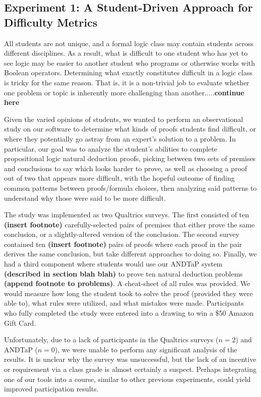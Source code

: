 \documentclass[ms]{uncgdissertationexp2}
\theoremstyle{plain}
\theoremstyle{definition}
\theoremstyle{remark}
\begin{document}
\subsection{Experiment 1: A Student-Driven Approach for Difficulty Metrics}
All students are not unique, and a formal logic class may contain students across different disciplines. As a result, what is difficult to one student who has yet to see logic may be easier to another student who programs or otherwise works with Boolean operators. Determining what exactly constitutes difficult in a logic class is tricky for the same reason. That is, it is a non-trivial job to evaluate whether one problem or topic is inherently more challenging than another.....\textbf{continue here}

Given the varied opinions of students, we wanted to perform an observational study on our software to determine what kinds of proofs students find difficult, or where they potentially go astray from an expert's solution to a problem. In particular, our goal was to analyze the student's abilities to complete propositional logic natural deduction proofs, picking between two sets of premises and conclusions to say which looks harder to prove, as well as choosing a proof out of two that appears more difficult, with the hopeful outcome of finding common patterns between proofs/formula choices, then analyzing said patterns to understand why those were said to be more difficult.

The study was implemented as two Qualtrics surveys. The first consisted of ten \textbf{(insert footnote)} carefully-selected pairs of premises that either prove the same conclusion, or a slightly-altered version of the conclusion. The second survey contained ten \textbf{(insert footnote)} pairs of proofs where each proof in the pair derives the same conclusion, but take different approaches to doing so. Finally, we had a third component where students would use our ANDTaP system \textbf{(described in section blah blah)} to prove ten natural deduction problems \textbf{(append footnote to problems)}. A cheat-sheet of all rules was provided. We would measure how long the student took to solve the proof (provided they were able to), what rules were utilized, and what mistakes were made. Participants who fully completed the study were entered into a drawing to win a \$50 Amazon Gift Card.

Unfortunately, due to a lack of participants in the Qualtrics surveys ($n=2$) and ANDTaP ($n=0$), we were unable to perform any significant analysis of the results. It is unclear why the survey was unsuccessful, but the lack of an incentive or requirement via a class grade is almost certainly a suspect. Perhaps integrating one of our tools into a course, similar to other previous experiments, could yield improved participation results.
\end{document}
